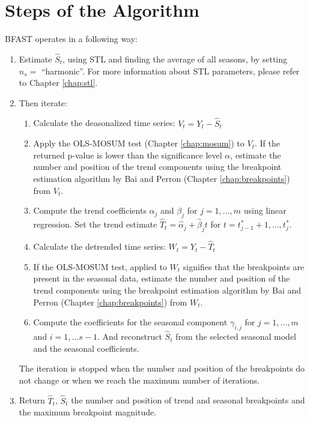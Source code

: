 \documentclass[main.tex]{subfiles}
\begin{document}
\section{Steps of the Algorithm}
\label{sec:bfast_algorithm_steps}
BFAST operates in a following way:
\begin{enumerate}
\item Estimate $\hat{S}_t$, using STL and finding the average of all seasons, by
  setting $n_s =$ ``harmonic''. For more information about STL parameters,
  please refer to Chapter \ref{chap:stl}.
\item Then iterate:
  \begin{enumerate}[1)]
    \item Calculate the deasonalized time series: $V_t = Y_t - \hat{S}_t$
    \item Apply the OLS-MOSUM test (Chapter \ref{chap:mosum}) to $V_t$. If the
      returned p-value is lower than the significance level $\alpha$, estimate
      the number and position of the trend components using the breakpoint
      estimation algorithm by Bai and Perron (Chapter \ref{chap:breakpoints}) from $V_t$.
    \item Compute the trend coefficients $\alpha_j$ and $\beta_j$ for
      $j = 1, \hdots, m$ using linear regression. Set the trend estimate
      $\hat{T}_t = \hat{\alpha}_j + \hat{\beta}_j t$ for
      $t = t^*_{j-1} + 1, \hdots, t^*_j$.
    \item Calculate the detrended time series: $W_t = Y_t - \hat{T}_t$
    \item If the OLS-MOSUM test, applied to $W_t$ signifies that the breakpoints
      are present in the seasonal data, estimate
      the number and position of the trend components using the breakpoint
      estimation algorithm by Bai and Perron (Chapter \ref{chap:breakpoints}) from $W_t$.
    \item Compute the coefficients for the seasonal component $\gamma_{i,j}$ for
      $j = 1, \hdots, m$ and $i = 1,\hdots s-1$. And reconstruct $\hat{S}_t$
      from the selected seasonal model and the seasonal coefficients.
  \end{enumerate}
  The iteration is stopped when the number and position of the breakpoints do
  not change or when we reach the maximum number of iterations.
\item Return $\hat{T}_t$, $\hat{S}_t$ the number and position of trend and
  seasonal breakpoints and the maximum breakpoint magnitude.
\end{enumerate}
\end{document}
